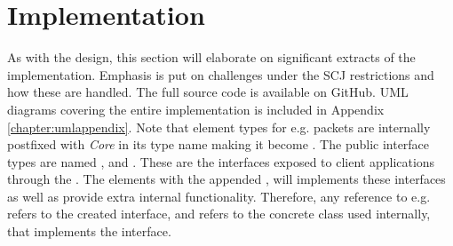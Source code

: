 \section{Implementation}
As with the design, this section will elaborate on significant extracts of the implementation. Emphasis is put on challenges under the SCJ restrictions and how these are handled. The full source code is available on GitHub\cite{SW902e12:CSPinSCJ}. UML diagrams covering the entire implementation is included in Appendix \ref{chapter:umlappendix}. Note that element types for e.g. packets are internally postfixed with \textit{Core} in its type name making it become . The public interface types are named ,  and . These are the interfaces exposed to client applications through the . The elements with the appended , will implements these interfaces as well as provide extra internal functionality. Therefore, any reference to e.g.  refers to the created interface, and  refers to the concrete class used internally, that implements the interface.